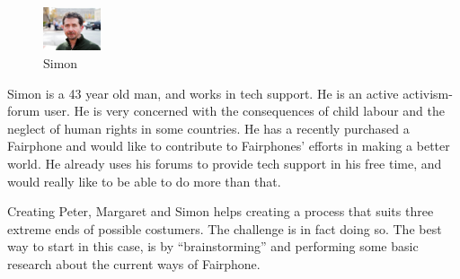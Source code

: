 \documentclass[final]{scrreprt} %
\begin{document}
\begin{figure}
	\centering
	\includegraphics[width=0.15\textwidth]{./images/Simon}
	\caption{\label{fig:Simon}Simon}
\end{figure}

Simon is a 43 year old man, and works in tech support. He is an active activism-forum user. He is very concerned with the consequences of child labour and the neglect of human rights in some countries. He has a recently purchased a Fairphone and would like to contribute to Fairphones' efforts in making a better world. He already uses his forums to provide tech support in his free time, and would really like to be able to do more than that.

Creating Peter, Margaret and Simon helps creating a process that suits three extreme ends of possible costumers. The challenge is in fact doing so. The best way to start in this case, is by ``brainstorming'' and performing some basic research about the current ways of Fairphone.
\end{document}
